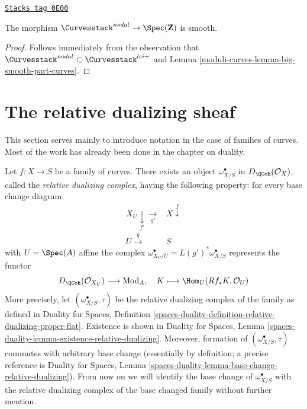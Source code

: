 \begin{lemma}
\label{moduli-curves-lemma-nodal-curves-smooth}
\href{https://stacks.math.columbia.edu/tag/0E00}{\texttt{Stacks tag 0E00}}

The morphism $\Curvesstack^{nodal} \to \Spec(\mathbf{Z})$ is smooth.
\end{lemma}

\begin{proof}
Follows immediately from the observation that
$\Curvesstack^{nodal} \subset \Curvesstack^{lci+}$
and Lemma \ref{moduli-curves-lemma-big-smooth-part-curves}.
\end{proof}

\section{The relative dualizing sheaf}
\label{moduli-curves-section-relative-dualizing}
This section serves mainly
to introduce notation in the case of families of curves.
Most of the work has already been done in the chapter on duality.

\medskip\noindent
Let $f : X \to S$ be a family of curves. There exists an object
$\omega_{X/S}^\bullet$ in $D_\QCoh(\mathcal{O}_X)$,
called the {\it relative dualizing complex}, having the following
property: for every base change diagram
$$
\begin{array}{cc}X_U \underset{f'}{\downarrow}\underset{g'}{\longrightarrow} & X \overset{f}{\downarrow} \\ U \overset{g}{\longrightarrow} & S\end{array}
$$
with $U = \Spec(A)$ affine the complex
$\omega_{X_U/U}^\bullet = L(g')^*\omega_{X/S}^\bullet$
represents the functor
$$
D_\QCoh(\mathcal{O}_{X_U}) \longrightarrow \text{Mod}_A,\quad
K \longmapsto \Hom_U(Rf_*K, \mathcal{O}_U)
$$
More precisely, let $(\omega_{X/S}^\bullet, \tau)$
be the relative dualizing complex of the family as defined in
Duality for Spaces, Definition
\ref{spaces-duality-definition-relative-dualizing-proper-flat}.
Existence is shown in Duality for Spaces, Lemma
\ref{spaces-duality-lemma-existence-relative-dualizing}.
Moreover, formation of $(\omega_{X/S}^\bullet, \tau)$ commutes
with arbitrary base change (essentially by definition; a precise
reference is Duality for Spaces, Lemma
\ref{spaces-duality-lemma-base-change-relative-dualizing}).
From now on we will identify the base change of
$\omega_{X/S}^\bullet$ with the relative dualizing
complex of the base changed family without further mention.

